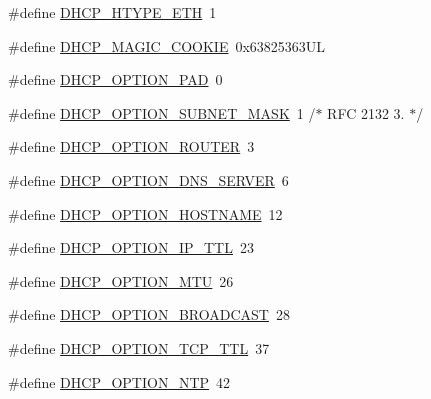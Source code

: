 \begin{DoxyCompactItemize}
\#define \hyperlink{openmote-cc2538_2lwip_2src_2include_2lwip_2prot_2dhcp_8h_aa9bbddbdf30ee61e9bc529d1981f943a}{D\+H\+C\+P\+\_\+\+H\+T\+Y\+P\+E\+\_\+\+E\+TH}~1
\item 
\#define \hyperlink{openmote-cc2538_2lwip_2src_2include_2lwip_2prot_2dhcp_8h_ac38bb410b5a906ccc81317bf2197d0d5}{D\+H\+C\+P\+\_\+\+M\+A\+G\+I\+C\+\_\+\+C\+O\+O\+K\+IE}~0x63825363\+UL
\item 
\#define \hyperlink{openmote-cc2538_2lwip_2src_2include_2lwip_2prot_2dhcp_8h_afcfde7a8c1ec0e3055d9a01ef2fa6aa9}{D\+H\+C\+P\+\_\+\+O\+P\+T\+I\+O\+N\+\_\+\+P\+AD}~0
\item 
\#define \hyperlink{openmote-cc2538_2lwip_2src_2include_2lwip_2prot_2dhcp_8h_acff5b8c45e6d63afd973aa8a0e72a901}{D\+H\+C\+P\+\_\+\+O\+P\+T\+I\+O\+N\+\_\+\+S\+U\+B\+N\+E\+T\+\_\+\+M\+A\+SK}~1 /$\ast$ R\+FC 2132 3. $\ast$/
\item 
\#define \hyperlink{openmote-cc2538_2lwip_2src_2include_2lwip_2prot_2dhcp_8h_a72cfc4e231017d1d116bb1d69d18ae8c}{D\+H\+C\+P\+\_\+\+O\+P\+T\+I\+O\+N\+\_\+\+R\+O\+U\+T\+ER}~3
\item 
\#define \hyperlink{openmote-cc2538_2lwip_2src_2include_2lwip_2prot_2dhcp_8h_a8f05c5c6084fbac0be7b24101189232b}{D\+H\+C\+P\+\_\+\+O\+P\+T\+I\+O\+N\+\_\+\+D\+N\+S\+\_\+\+S\+E\+R\+V\+ER}~6
\item 
\#define \hyperlink{openmote-cc2538_2lwip_2src_2include_2lwip_2prot_2dhcp_8h_a8336c0e435dd07302c1b433d2c9197be}{D\+H\+C\+P\+\_\+\+O\+P\+T\+I\+O\+N\+\_\+\+H\+O\+S\+T\+N\+A\+ME}~12
\item 
\#define \hyperlink{openmote-cc2538_2lwip_2src_2include_2lwip_2prot_2dhcp_8h_ab43ba1742cc39cd192431e9c8c3ea48d}{D\+H\+C\+P\+\_\+\+O\+P\+T\+I\+O\+N\+\_\+\+I\+P\+\_\+\+T\+TL}~23
\item 
\#define \hyperlink{openmote-cc2538_2lwip_2src_2include_2lwip_2prot_2dhcp_8h_abb0093dc9bbeff548b78ff876a36acd5}{D\+H\+C\+P\+\_\+\+O\+P\+T\+I\+O\+N\+\_\+\+M\+TU}~26
\item 
\#define \hyperlink{openmote-cc2538_2lwip_2src_2include_2lwip_2prot_2dhcp_8h_ac6c1fce157c3297412cfb28d0822a93b}{D\+H\+C\+P\+\_\+\+O\+P\+T\+I\+O\+N\+\_\+\+B\+R\+O\+A\+D\+C\+A\+ST}~28
\item 
\#define \hyperlink{openmote-cc2538_2lwip_2src_2include_2lwip_2prot_2dhcp_8h_a608af55ab345fa8ee3aa32c95bb4786f}{D\+H\+C\+P\+\_\+\+O\+P\+T\+I\+O\+N\+\_\+\+T\+C\+P\+\_\+\+T\+TL}~37
\item 
\#define \hyperlink{openmote-cc2538_2lwip_2src_2include_2lwip_2prot_2dhcp_8h_ae5a724660dd11c27d8ed477f0ee136e3}{D\+H\+C\+P\+\_\+\+O\+P\+T\+I\+O\+N\+\_\+\+N\+TP}~42

\end{DoxyCompactItemize}
